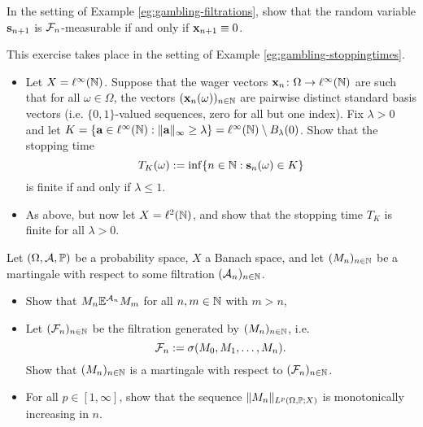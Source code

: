 \begin{exercise}\label{ex:winnings-unpredictability}
  In the setting of Example \ref{eg:gambling-filtrations}, show that the random variable $\mb{s}_{n+1}$ is $\mc{F}_n$-measurable if and only if $\mb{x}_{n+1} \equiv 0$.
\end{exercise}

\begin{exercise}\label{ex:gambling-in-linfty}
  This exercise takes place in the setting of Example \ref{eg:gambling-stoppingtimes}.
  \begin{itemize}
  \item
    Let $X = \ell^\infty(\N)$.
    Suppose that the wager vectors $\map{\mb{x}_n}{\Omega}{\ell^\infty(\N)}$ are such that for all $\omega \in \Omega$, the vectors $(\mb{x}_n(\omega))_{n \in \N}$ are pairwise distinct standard basis vectors (i.e. $\{0,1\}$-valued sequences, zero for all but one index).
    Fix $\lambda > 0$ and let $K = \{\mb{a} \in \ell^\infty(\N) : \|\mb{a}\|_\infty \geq \lambda\} = \ell^\infty(\N) \sm B_\lambda(0)$.
    Show that the stopping time
    \begin{equation*}
      T_K(\omega) := \inf\{n \in \N : \mb{s}_n(\omega) \in K\} 
    \end{equation*}
    is finite if and only if $\lambda \leq 1$.
  \item
    As above, but now let $X = \ell^2(\N)$, and show that the stopping time $T_K$ is finite for all $\lambda > 0$.
  \end{itemize}
\end{exercise}

\begin{exercise}\label{ex:martingale-elementary-properties}
  Let $(\Omega,\mc{A},\P)$ be a probability space, $X$ a Banach space, and let $(M_n)_{n \in \N}$ be a martingale with respect to some filtration $(\mc{A}_n)_{n \in \N}$.
  \begin{itemize}
  \item
    Show that $M_n  \E^{\mc{A}_n} M_m$ for all $n,m \in \N$ with $m > n$,
  \item
    Let $(\mc{F}_n)_{n \in \N}$ be the filtration generated by $(M_n)_{n \in \N}$, i.e.
    \begin{equation*}
      \mc{F}_n := \sigma(M_0, M_1, \ldots, M_n).
    \end{equation*}
    Show that $(M_n)_{n \in \N}$ is a martingale with respect to $(\mc{F}_n)_{n \in \N}$.
  \item
    For all $p \in [1,\infty]$, show that the sequence $\|M_n\|_{L^p(\Omega,\P;X)}$ is monotonically increasing in $n$.
  \end{itemize}

\end{exercise}



